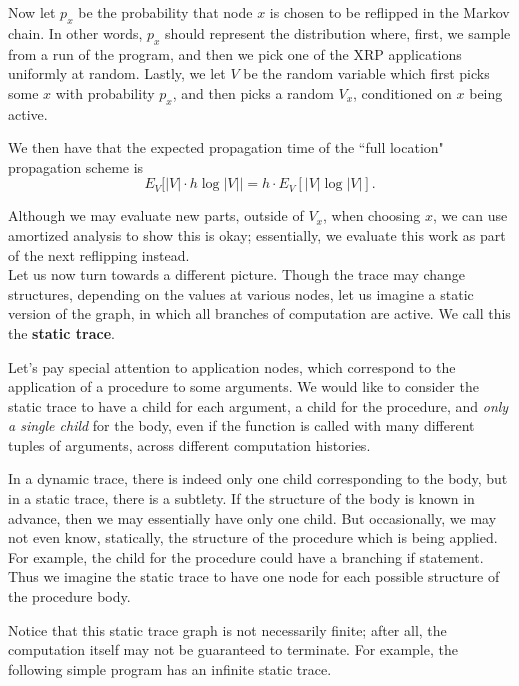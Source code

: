 \documentclass[10pt]{article}
\begin{document}
Now let $p_x$ be the probability that node $x$ is chosen to be reflipped in the Markov chain.  In other words, $p_x$ should represent the distribution where, first, we sample from a run of the program, and then we pick one of the XRP applications uniformly at random.  Lastly, we let $V$ be the random variable which first picks some $x$ with probability $p_x$, and then picks a random $V_x$, conditioned on $x$ being active.

We then have that the expected propagation time of the ``full location" propagation scheme is 
$$E_V[ |V| \cdot h \log |V| | = h  \cdot E_V[|V| \log |V|]. $$

Although we may evaluate new parts, outside of $V_x$, when choosing $x$, we can use amortized analysis to show this is okay; essentially, we evaluate this work as part of the next reflipping instead.  
 \\

Let us now turn towards a different picture.  Though the trace may change structures, depending on the values at various nodes, let us imagine a static version of the graph, in which all branches of computation are active.  We call this the {\bf static trace}.  

Let's pay special attention to application nodes, which correspond to the application of a procedure to some arguments.  We would like to consider the static trace to have a child for each argument, a child for the procedure, and {\em only a single child} for the body, even if the function is called with many different tuples of arguments, across different computation histories.   

In a dynamic trace, there is indeed only one child corresponding to the body, but in a static trace, there is a subtlety.  If the structure of the body is known in advance, then we may essentially have only one child.  But occasionally, we may not even know, statically, the structure of the procedure which is being applied.  For example, the child for the procedure could have a branching if statement.  Thus we imagine the static trace to have one node for each possible structure of the procedure body.  

Notice that this static trace graph is not necessarily finite; after all, the computation itself may not be guaranteed to terminate.  For example, the following simple program has an infinite static trace.
\end{document}
